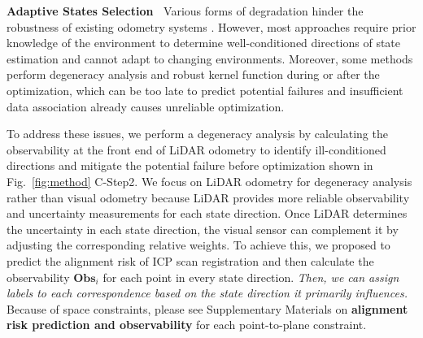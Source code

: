 \textbf{Adaptive States Selection~}
Various forms of degradation hinder the robustness of existing odometry systems \cite{xu2021fast}\cite{LVI-SAM}. 
However, most approaches require prior knowledge of the environment to determine well-conditioned directions of state estimation and cannot adapt to changing environments\cite{degeneracy,zhen2019estimating,ding2021degeneration,hinduja2019degeneracy}.
Moreover, some methods perform degeneracy analysis \cite{ebadi2021dare} and robust kernel function \cite{chebrolu2021adaptive} during or after the optimization, which can be too late to predict potential failures \cite{degeneracy} and insufficient data association already causes unreliable optimization. 

To address these issues, we perform a degeneracy analysis by calculating the observability at the front end of LiDAR odometry to identify ill-conditioned directions and mitigate the potential failure before optimization shown in Fig.~\ref{fig:method} C-Step2.  We focus on LiDAR odometry for degeneracy analysis rather than visual odometry because LiDAR provides more reliable observability and uncertainty measurements for each state direction. Once LiDAR determines the uncertainty in each state direction, the visual sensor can complement it by adjusting the corresponding relative weights. To achieve this, we proposed to predict the alignment risk of ICP scan registration and then calculate the observability $\mathbf{Obs}_i$ for each point in every state direction. \textit{Then, we can assign labels to each correspondence based on the state direction it primarily influences. } Because of space constraints, please see Supplementary Materials on \textbf{alignment risk prediction and observability} for each point-to-plane constraint. 

